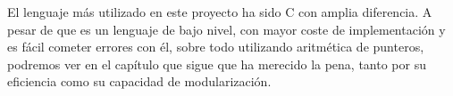 \smallskip

El lenguaje más utilizado en este proyecto ha sido C con amplia diferencia. A pesar de que es un lenguaje de bajo nivel, con mayor coste de implementación y es fácil cometer errores con él, sobre todo utilizando aritmética de punteros, podremos ver en el capítulo que sigue que ha merecido la pena, tanto por su eficiencia como su capacidad de modularización.